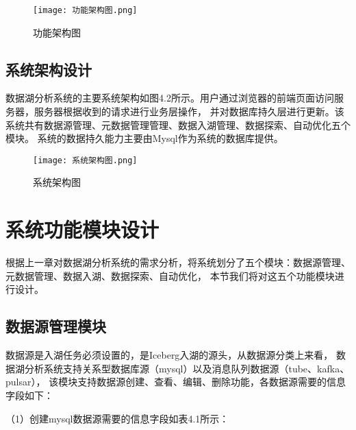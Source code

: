 \begin{figure}[h]
  \centering
  \texttt{[image: 功能架构图.png]}
  \caption{功能架构图}
  \label{fig:badge}
\end{figure}

\subsection{系统架构设计}

数据湖分析系统的主要系统架构如图4.2所示。用户通过浏览器的前端页面访问服务器，服务器根据收到的请求进行业务层操作，
并对数据库持久层进行更新。该系统共有数据源管理、元数据管理管理、数据入湖管理、数据探索、自动优化五个模块。
系统的数据持久能力主要由Mysql作为系统的数据库提供。

\begin{figure}[h]
  \centering
  \texttt{[image: 系统架构图.png]}
  \caption{系统架构图}
  \label{fig:badge}
\end{figure}

\section{系统功能模块设计}

根据上一章对数据湖分析系统的需求分析，将系统划分了五个模块：数据源管理、元数据管理、数据入湖、数据探索、自动优化，
本节我们将对这五个功能模块进行设计。

\subsection{数据源管理模块}

数据源是入湖任务必须设置的，是Iceberg入湖的源头，从数据源分类上来看，
数据湖分析系统支持关系型数据库源（mysql）以及消息队列数据源（tube、kafka、pulsar），
该模块支持数据源创建、查看、编辑、删除功能，各数据源需要的信息字段如下：

（1）创建mysql数据源需要的信息字段如表4.1所示：

